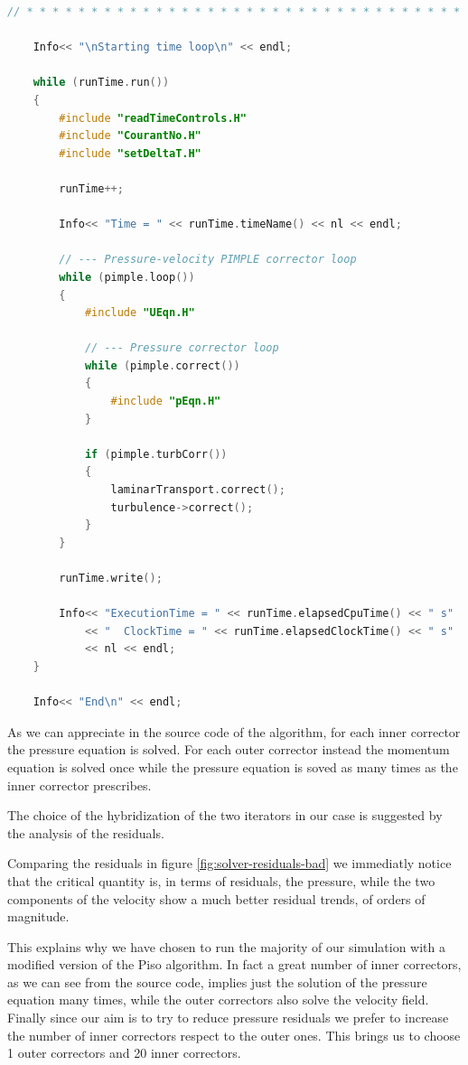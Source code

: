\documentclass[a4paper,12pt]{article}
\newcommand{\foam}[1]{{\ttfamily #1}}
\begin{document}
\begin{lstlisting}[language=c++, caption={\foam{pimpleFoam} source code extract.}]
// * * * * * * * * * * * * * * * * * * * * * * * * * * * * * * * * * * * //

    Info<< "\nStarting time loop\n" << endl;

    while (runTime.run())
    {
        #include "readTimeControls.H"
        #include "CourantNo.H"
        #include "setDeltaT.H"

        runTime++;

        Info<< "Time = " << runTime.timeName() << nl << endl;

        // --- Pressure-velocity PIMPLE corrector loop
        while (pimple.loop())
        {
            #include "UEqn.H"

            // --- Pressure corrector loop
            while (pimple.correct())
            {
                #include "pEqn.H"
            }

            if (pimple.turbCorr())
            {
                laminarTransport.correct();
                turbulence->correct();
            }
        }

        runTime.write();

        Info<< "ExecutionTime = " << runTime.elapsedCpuTime() << " s"
            << "  ClockTime = " << runTime.elapsedClockTime() << " s"
            << nl << endl;
    }

    Info<< "End\n" << endl;
\end{lstlisting}

As we can appreciate in the source code of the algorithm, for each inner corrector the pressure equation is solved.
For each outer corrector instead the momentum equation is solved once while the pressure equation is soved as many times as the inner corrector prescribes.

The choice of the hybridization of the two iterators in our case is suggested by the analysis of the residuals.

Comparing the residuals in figure \ref{fig:solver-residuals-bad} we immediatly notice that the critical quantity is, in terms of residuals, the pressure,
while the two components of the velocity show a much better residual trends, of orders of magnitude.

This explains why we have chosen to run the majority of our simulation with a modified version of the Piso algorithm. 
In fact a great number of inner correctors, as we can see from the source code, implies just the solution of the pressure equation many times, 
while the outer correctors also solve the velocity field.
Finally since our aim is to try to reduce pressure residuals we prefer to increase the number of inner correctors respect to the outer ones.
This brings us to choose 1 outer correctors and 20 inner correctors.
 
\end{document}
